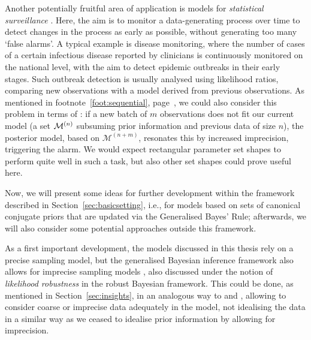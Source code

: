 Another potentially fruitful area of application is models for \emph{statistical surveillance}
\parencite[for a brief overview see, e.g.,][]{2011:IESS-surveillance}.
Here, the aim is to monitor a data-generating process over time
to detect changes in the process as early as possible,
without generating too many `false alarms'.
A typical example is disease monitoring,
where the number of cases of a certain infectious disease reported by clinicians
is continuously monitored on the national level,
with the aim to detect epidemic outbreaks in their early stages.
Such outbreak detection is usually analysed using likelihood ratios,
comparing new observations with a model derived from previous observations. 
As mentioned in footnote~\ref{foot:sequential}, page~\pageref{foot:sequential},
we could also consider this problem in terms of \pdc:
if a new batch of $m$ observations does not fit our current model
(a set $\mathcal{M}^{(n)}$ subsuming prior information and previous data of size $n$),
the posterior model, based on $\mathcal{M}^{(n+m)}$, resonates this by increased imprecision,
triggering the alarm.
We would expect rectangular parameter set shapes to perform quite well in such a task,
but also other set shapes could prove useful here.

\medskip

Now, we will present some ideas for further development within the framework
described in Section~\ref{sec:basicsetting}, i.e.,
for models based on sets of canonical conjugate priors
that are updated via the Generalised Bayes' Rule;
afterwards, we will also consider some potential approaches outside this framework.

As a first important development,
the models discussed in this thesis rely on a precise sampling model,
but the generalised Bayesian inference framework also allows for imprecise sampling models
\parencite[see, in particular,][\S 8.5]{1991:walley},
also discussed under the notion of \emph{likelihood robustness} \parencite[e.g.,][]{2000:shyamalkumar} in the robust Bayesian framework.
This could be done, as mentioned in Section~\ref{sec:insights},
in an analogous way to \textcite{2007:utkinaugustin} and \textcite{2009:Troffaes:Coolen},
allowing to consider coarse or imprecise data adequately in the model,
not idealising the data in a similar way as we ceased to idealise prior information by allowing for imprecision.

